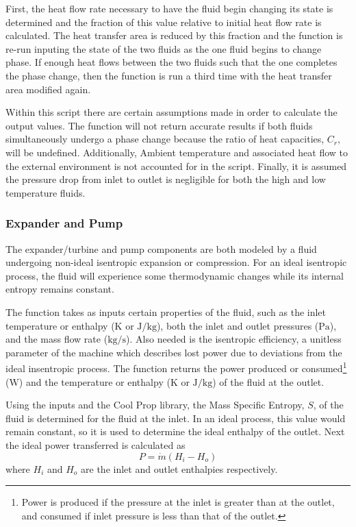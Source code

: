 First, the heat flow rate necessary to have the fluid begin changing its state is determined and the fraction of this value relative to initial heat flow rate is calculated. 
The heat transfer area is reduced by this fraction and the function is re-run inputing the state of the two fluids as the one fluid begins to change phase. If enough heat flows between the two fluids such that the one completes the phase change, then the function is run a third time with the heat transfer area modified again. 

Within this script there are certain assumptions made in order to calculate the output values. The function will not return accurate results if both fluids simultaneously undergo a phase change because the ratio of heat capacities, $C_r$, will be undefined. Additionally, Ambient temperature and associated heat flow to the external environment is not accounted for in the script. Finally, it is assumed the pressure drop from inlet to outlet is negligible for both the high and low temperature fluids. 

\subsubsection{Expander and Pump}
The expander/turbine and pump components are both modeled by a fluid undergoing non-ideal isentropic expansion or compression. For an ideal isentropic process, the fluid will experience some thermodynamic changes while its internal entropy remains constant. 

The function takes as inputs certain properties of the fluid, such as the inlet temperature or enthalpy ($\si{\kelvin}$ or $\si{\joule\per\kilogram}$), both the inlet and outlet pressures ($\si{\pascal}$), and the mass flow rate ($\si{\kilogram\per\second}$). Also needed is the isentropic efficiency, a unitless parameter of the machine which describes lost power due to deviations from the ideal insentropic process. The function returns the power produced or consumed\footnote{Power is produced if the pressure at the inlet is greater than at the outlet, and consumed if inlet pressure is less than that of the outlet.} ($\si{\watt}$) and the temperature or enthalpy ($\si{\kelvin}$ or $\si{\joule\per\kilogram}$) of the fluid at the outlet.

Using the inputs and the Cool Prop library, the Mass Specific Entropy, $S$, of the fluid is determined for the fluid at the inlet. In an ideal process, this value would remain constant, so it is used to determine the ideal enthalpy of the outlet. Next the ideal power transferred is calculated as 
\begin{equation}
\label{eq:power_enthalpy}
P = \dot{m} \left(H_i - H_o\right)
\end{equation}
where $H_i$ and $H_o$ are the inlet and outlet enthalpies respectively.

